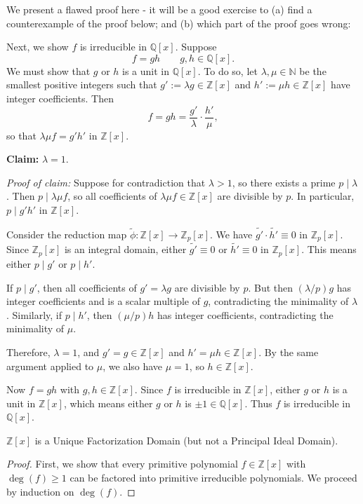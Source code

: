{{\color{blue} We present a flawed proof here - it will be a good exercise to (a) find a counterexample of the proof below; and (b) which part of the proof goes wrong:

Next, we show $f$ is irreducible in $\mathbb{Q}[x]$. Suppose 
$$f = gh \quad \quad g, h \in \mathbb{Q}[x].$$ 
We must show that $g$ or $h$ is a unit in $\mathbb{Q}[x]$.
To do so, let $\lambda, \mu \in \mathbb{N}$ be the smallest positive integers such that $g' := \lambda g \in \mathbb{Z}[x]$ and $h' := \mu h \in \mathbb{Z}[x]$ have integer coefficients. Then 
\[
f = gh = \frac{g'}{\lambda} \cdot \frac{h'}{\mu},
\]
so that $\lambda \mu f = g' h'$ in $\mathbb{Z}[x]$.

\noindent \textbf{Claim:} $\lambda = 1$.

\noindent \textit{Proof of claim:} Suppose for contradiction that $\lambda > 1$, so there exists a prime $p \mid \lambda$. Then $p \mid \lambda \mu f$, so all coefficients of $\lambda \mu f \in \mathbb{Z}[x]$ are divisible by $p$. In particular, $p \mid g' h'$ in $\mathbb{Z}[x]$.

Consider the reduction map $\tilde{\phi}: \mathbb{Z}[x] \to \mathbb{Z}_p[x]$. We have $\tilde{g'} \cdot \tilde{h'} \equiv 0$ in $\mathbb{Z}_p[x]$. Since $\mathbb{Z}_p[x]$ is an integral domain, either $\tilde{g'} \equiv 0$ or $\tilde{h'} \equiv 0$ in $\mathbb{Z}_p[x]$. This means either $p \mid g'$ or $p \mid h'$.

If $p \mid g'$, then all coefficients of $g' = \lambda g$ are divisible by $p$. But then $(\lambda/p) g$ has integer coefficients and is a scalar multiple of $g$, contradicting the minimality of $\lambda$. Similarly, if $p \mid h'$, then $(\mu/p) h$ has integer coefficients, contradicting the minimality of $\mu$.

Therefore, $\lambda = 1$, and $g' = g \in \mathbb{Z}[x]$ and $h' = \mu h \in \mathbb{Z}[x]$. By the same argument applied to $\mu$, we also have $\mu = 1$, so $h \in \mathbb{Z}[x]$.

Now $f = gh$ with $g, h \in \mathbb{Z}[x]$. Since $f$ is irreducible in $\mathbb{Z}[x]$, either $g$ or $h$ is a unit in $\mathbb{Z}[x]$, which means either $g$ or $h$ is $\pm 1 \in \mathbb{Q}[x]$. Thus $f$ is irreducible in $\mathbb{Q}[x]$.
}

\begin{corollary}
$\mathbb{Z}[x]$ is a Unique Factorization Domain (but not a Principal Ideal Domain).
\end{corollary}

\begin{proof}
First, we show that every primitive polynomial $f \in \mathbb{Z}[x]$ with $\deg(f) \ge 1$ can be factored into primitive irreducible polynomials. We proceed by induction on $\deg(f)$.


\end{proof}}
